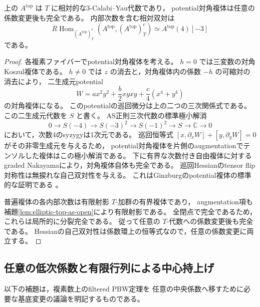 \begin{lemma}\label{lem:elliptic-top-relative-cy}
上の $A^{\mathrm{top}}$ は $T$ に相対的な3-Calabi--Yau代数であり，
potential対角複体は任意の係数変更後も完全である。
内部次数を含む相対双対は
\[
 R\!\operatorname{Hom}_{(A^{\mathrm{top}})^e_T}
       (A^{\mathrm{top}},(A^{\mathrm{top}})^e_T)
       \simeq A^{\mathrm{top}}(4)[-3]
\]
である。
\end{lemma}
\begin{proof}
各複素ファイバーでpotential対角複体を考える。
$h=0$ では三変数の対角Koszul複体である。
$h\ne0$ では $z$ の消去と，対角複体内の係数 $-h$ の可縮対の消去により，
二生成元potential
\[
 W=a x^2y^2+\frac b2xyxy+\frac c4(x^4+y^4)
\]
の対角複体になる。
このpotentialの巡回微分は上の二つの三次関係式である。
この二生成元代数を $S$ と書く。
AS正則三次代数の標準極小解消
\[
 0\longrightarrow S(-4)\longrightarrow S(-3)^2
  \longrightarrow S(-1)^2\longrightarrow S\longrightarrow\mathbb C
  \longrightarrow0
\]
において，次数4のsyzygyは1次元である。
巡回恒等式 $[x,\partial_xW]+[y,\partial_yW]=0$ がその非零生成元を与えるため，
potential対角複体を片側のaugmentationでテンソルした複体はこの極小解消である。
下に有界な次数付き自由複体に対するgraded Nakayamaにより，対角複体自体も完全である。
巡回Hessianのtensor flip対称性は無捩れな自己双対性を与える。
これはGinzburgのpotential複体の標準的な証明である
\cite[Proposition 5.1.9, Theorem 5.3.1, Proposition 8.1.3(ii)]{Ginzburg2007}。

普遍複体の各内部次数は有限射影 $T$-加群の有界複体であり，
augmentation項も補題\ref{lem:elliptic-top-as-open}により有限射影である。
全閉点で完全であるため，これらは局所的に分裂完全である。
従って任意の $T$-代数への係数変更後も完全である。
Hessianの自己双対性は係数環上の恒等式なので，任意の係数変更に両立する。
\end{proof}

\subsection{任意の低次係数と有限行列による中心持上げ}

以下の補題は，複素数上のfiltered PBW定理を
任意の中央係数へ移すために必要な基底変更の議論を明記するものである。

